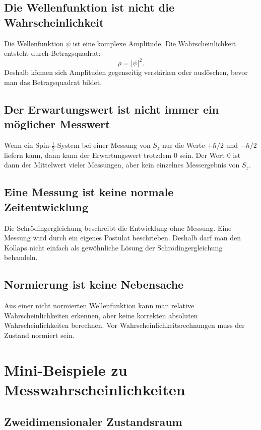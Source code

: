 \subsection{Die Wellenfunktion ist nicht die Wahrscheinlichkeit}

Die Wellenfunktion $\psi$ ist eine komplexe Amplitude. Die Wahrscheinlichkeit entsteht durch Betragsquadrat:
\[
    \rho=|\psi|^2.
\]
Deshalb können sich Amplituden gegenseitig verstärken oder auslöschen, bevor man das Betragsquadrat bildet.

\subsection{Der Erwartungswert ist nicht immer ein möglicher Messwert}

Wenn ein Spin-$\frac12$-System bei einer Messung von $S_z$ nur die Werte $+\hbar/2$ und $-\hbar/2$ liefern kann, dann kann der Erwartungswert trotzdem $0$ sein. Der Wert $0$ ist dann der Mittelwert vieler Messungen, aber kein einzelnes Messergebnis von $S_z$.

\subsection{Eine Messung ist keine normale Zeitentwicklung}

Die Schrödingergleichung beschreibt die Entwicklung ohne Messung. Eine Messung wird durch ein eigenes Postulat beschrieben. Deshalb darf man den Kollaps nicht einfach als gewöhnliche Lösung der Schrödingergleichung behandeln.

\subsection{Normierung ist keine Nebensache}

Aus einer nicht normierten Wellenfunktion kann man relative Wahrscheinlichkeiten erkennen, aber keine korrekten absoluten Wahrscheinlichkeiten berechnen. Vor Wahrscheinlichkeitsrechnungen muss der Zustand normiert sein.

\section{Mini-Beispiele zu Messwahrscheinlichkeiten}

\subsection{Zweidimensionaler Zustandsraum}

